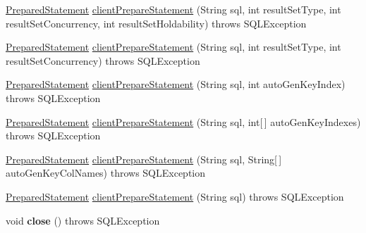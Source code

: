 \begin{DoxyCompactItemize}
\item 
\mbox{\hyperlink{classcom_1_1mysql_1_1jdbc_1_1_prepared_statement}{Prepared\+Statement}} \mbox{\hyperlink{classcom_1_1mysql_1_1jdbc_1_1_multi_host_my_s_q_l_connection_a5b3d4ce08f970c43ce42d939eae35b38}{client\+Prepare\+Statement}} (String sql, int result\+Set\+Type, int result\+Set\+Concurrency, int result\+Set\+Holdability)  throws S\+Q\+L\+Exception 
\item 
\mbox{\hyperlink{classcom_1_1mysql_1_1jdbc_1_1_prepared_statement}{Prepared\+Statement}} \mbox{\hyperlink{classcom_1_1mysql_1_1jdbc_1_1_multi_host_my_s_q_l_connection_ad04846601b79203af77929064f64c043}{client\+Prepare\+Statement}} (String sql, int result\+Set\+Type, int result\+Set\+Concurrency)  throws S\+Q\+L\+Exception 
\item 
\mbox{\hyperlink{classcom_1_1mysql_1_1jdbc_1_1_prepared_statement}{Prepared\+Statement}} \mbox{\hyperlink{classcom_1_1mysql_1_1jdbc_1_1_multi_host_my_s_q_l_connection_a71d9841bc1d2d9d49980fb98d780c84c}{client\+Prepare\+Statement}} (String sql, int auto\+Gen\+Key\+Index)  throws S\+Q\+L\+Exception 
\item 
\mbox{\hyperlink{classcom_1_1mysql_1_1jdbc_1_1_prepared_statement}{Prepared\+Statement}} \mbox{\hyperlink{classcom_1_1mysql_1_1jdbc_1_1_multi_host_my_s_q_l_connection_a943b6c7d2931f82f72806b47271f259c}{client\+Prepare\+Statement}} (String sql, int\mbox{[}$\,$\mbox{]} auto\+Gen\+Key\+Indexes)  throws S\+Q\+L\+Exception 
\item 
\mbox{\hyperlink{classcom_1_1mysql_1_1jdbc_1_1_prepared_statement}{Prepared\+Statement}} \mbox{\hyperlink{classcom_1_1mysql_1_1jdbc_1_1_multi_host_my_s_q_l_connection_aa9841555ae046be40f86ba4a2e4f79ed}{client\+Prepare\+Statement}} (String sql, String\mbox{[}$\,$\mbox{]} auto\+Gen\+Key\+Col\+Names)  throws S\+Q\+L\+Exception 
\item 
\mbox{\hyperlink{classcom_1_1mysql_1_1jdbc_1_1_prepared_statement}{Prepared\+Statement}} \mbox{\hyperlink{classcom_1_1mysql_1_1jdbc_1_1_multi_host_my_s_q_l_connection_af9777071bc7848bd47f094d8ff57d54d}{client\+Prepare\+Statement}} (String sql)  throws S\+Q\+L\+Exception 
\item 
\mbox{\label{classcom_1_1mysql_1_1jdbc_1_1_multi_host_my_s_q_l_connection_a536adf7218ff8625e1198883bf79ee0d}} 
void {\bfseries close} ()  throws S\+Q\+L\+Exception 
\item 
\mbox{\label{classcom_1_1mysql_1_1jdbc_1_1_multi_host_my_s_q_l_connection_af0da91a2bd55095ca6b998ca4f0e49a0}} 

\end{DoxyCompactItemize}
